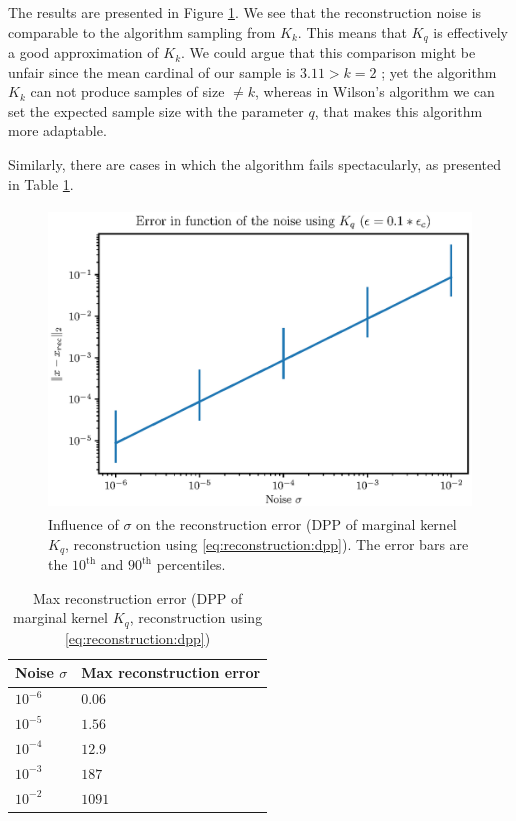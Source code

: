\documentclass{article}
\begin{document}
The results are presented in Figure \ref{fig:Kq:recerror}. We see that the reconstruction noise is comparable to the algorithm sampling from $K_k$. This means that $K_q$ is effectively a good approximation of $K_k$. We could argue that this comparison might be unfair since the mean cardinal of our sample is $3.11 > k = 2$ ; yet the algorithm $K_k$ can not produce samples of size $\neq k$, whereas in Wilson's algorithm we can set the expected sample size with the parameter $q$, that makes this algorithm more adaptable. 


Similarly, there are cases in which the algorithm fails spectacularly, as presented in Table \ref{tab:Kq:maxrecerror}.


\begin{figure}[ht]
\centering
\includegraphics[height=8cm]{error_function_noise_Kq.eps}
\caption{Influence of $\sigma$ on the reconstruction error (DPP of marginal kernel $K_q$, reconstruction using \eqref{eq:reconstruction:dpp}). The error bars are the $10^\text{th}$ and $90^\text{th}$ percentiles.} \label{fig:Kq:recerror}
\end{figure}


\begin{table}[ht]
  \caption{Max reconstruction error (DPP of marginal kernel $K_q$, reconstruction using \eqref{eq:reconstruction:dpp})}
  \label{tab:Kq:maxrecerror}
  \centering
  \begin{tabular}{ll}
    \toprule
    Noise $\sigma$ &  Max reconstruction error \\
    \midrule
    $10^{-6}$ & $0.06$ \\
    $10^{-5}$ & $1.56$ \\
    $10^{-4}$ & $12.9$ \\
		$10^{-3}$ & $187$ \\
		$10^{-2}$ & $1091$ \\
    \bottomrule
  \end{tabular}
\end{table}
\end{document}

